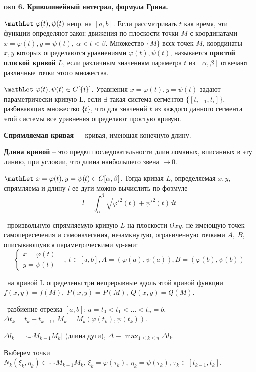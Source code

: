 \textbf{\LARGE osn 6. Криволинейный интеграл, формула Грина.}

$\mathLet ~ \varphi(t), \psi(t)$ непр. на $[a,b]$. 
Если рассматривать $t$ как время, эти функции определяют закон движения по плоскости точки $M$ с координатами 
$x = \varphi(t), y = \psi(t), ~ \alpha < t < \beta$. Множество $\{M\}$ всех точек $M$, координаты $x,y$ которых определяются уравнениями $\varphi(t), \psi(t)$, называется \textbf{простой плоской кривой} $L$, если различным значениям параметра $t$ из $[\alpha, \beta]$ отвечают различные точки этого множества.

$\mathLet ~ \varphi(t), \psi(t) \in C[\{t\}]$. Уравнения $x = \varphi(t), y = \psi(t)$ задают параметрически кривую L, если $\exists$ такая система сегментов $\{[t_{i-1}, t_i]\}$, разбивающих множество $\{t\}$, что для значений $t$ из каждого данного сегмента этой системы все уравнения определяют простую кривую.

\textbf{Спрямляемая кривая} --- кривая, имеющая конечную длину.

\textbf{Длина кривой} -- это предел последовательности длин ломаных, вписанных в эту линию, при условии, что длина наибольшего звена $\rightarrow 0$.

\bigbreak
$\mathLet ~ x = \varphi(t), y = \psi(t) \in C[\alpha, \beta]$. Тогда кривая $L$, определяемая $x, y$, спрямляема и длину $l$ ее дуги можно вычислить по формуле
$$l = \int^{\beta}_{\alpha} \sqrt{\varphi'^2(t) + \psi'^2(t)}dt$$

\faEye \ произвольную спрямляемую кривую $L$ на плоскости $Oxy$, не имеющую точек самопересечения и самоналегания, незамкнутую, ограниченную точками $A,~B$, описывающуюся параметрическими ур-ями:
$$\begin{cases} x=\varphi(t)&\\ y=\psi(t)\end{cases},~t\in [a,b], A=(\varphi(a),\psi(a)), B=(\varphi(b),\psi(b))$$

\mathLet \ на кривой L определены три непрерывные вдоль этой кривой функции $f(x,y)=f(M),~P(x,y)=P(M),~Q(x,y)=Q(M)$.

\faEye \ разбиение отрезка 
$[a,b]:~a=t_0 < t_1 < \dots < t_n = b,~$
$\Delta t_k = t_k-t_{k-1}, ~ M_k = M_k(\varphi(t_k),\psi(t_k))$.

$\Delta l_k = |\smile M_{k-1}M_k|$ (длина дуги), $\Delta \equiv \displaystyle\max_{1\leqslant k\leqslant n} \Delta l_k$.

Выберем точки $N_k(\xi_k, \eta_k) \in \smile M_{k-1}M_k,~\xi_k=\varphi(\tau_k),~\eta_k=\psi(\tau_k),~\tau_k\in [t_{k-1},t_k]$.


